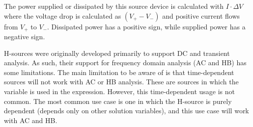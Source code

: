 \begin{Device}
The power supplied or dissipated by this source device is calculated
with $I \cdot \Delta V$ where the voltage drop is calculated as $(V_+ - V_-)$
and positive current flows from $V_+$ to $V_-$.  Dissipated power has a
positive sign, while supplied power has a negative sign.

H-sources were originally developed primarily to support DC and transient analysis.  
As such, their support for frequency domain analysis (AC and HB) has some limitations.  
The main limitation to be aware of is that time-dependent sources will not work with AC or HB analysis.  
These are sources in which the variable  is used in the  expression. 
However, this time-dependent usage is not common.  The most 
common use case is one in which the H-source is purely dependent (depends only 
on other solution variables), and this use case will work with AC and HB.  

\end{Device}
